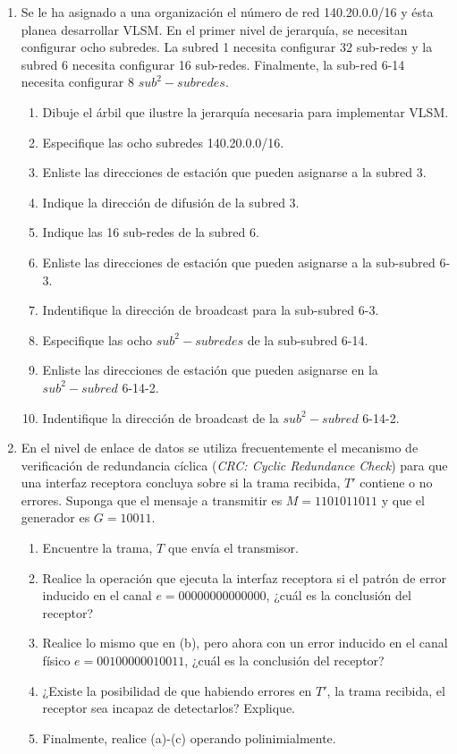 \begin{enumerate}
    \item Se le ha asignado a una organizaci\'on el n\'umero de red 140.20.0.0/16 y \'esta planea desarrollar VLSM. En el primer nivel de jerarqu\'ia,
    se necesitan configurar ocho subredes. La subred 1 necesita configurar 32 sub-redes y la subred 6 necesita configurar 16 sub-redes. Finalmente, la
    sub-red 6-14 necesita configurar 8 \(sub^2-subredes\).
    \begin{enumerate}
        \item Dibuje el \'arbil que ilustre la jerarqu\'ia necesaria para implementar VLSM.
        \item Especifique las ocho subredes 140.20.0.0/16.
        \item Enliste las direcciones de estaci\'on que pueden asignarse a la subred 3.
        \item Indique la direcci\'on de difusi\'on de la subred 3.
        \item Indique las 16 sub-redes de la subred 6.
        \item Enliste las direcciones de estaci\'on que pueden asignarse a la sub-subred 6-3.
        \item Indentifique la direcci\'on de broadcast para la sub-subred 6-3.
        \item Especifique las ocho \(sub^2-subredes\) de la sub-subred 6-14.
        \item Enliste las direcciones de estaci\'on que pueden asignarse en la \(sub^2-subred\) 6-14-2.
        \item Indentifique la direcci\'on de broadcast de la \(sub^2-subred\) 6-14-2.
    \end{enumerate}

    \item En el nivel de enlace de datos se utiliza frecuentemente el mecanismo de verificaci\'on de redundancia c\'iclica (\textit{CRC: Cyclic 
    Redundance Check}) para que una interfaz receptora concluya sobre si la trama recibida, \(T'\) contiene o no errores. Suponga que el mensaje
    a transmitir es \(M=1101011011\) y que el generador es \(G=10011\).
    \begin{enumerate}
        \item Encuentre la trama, \(T\) que env\'ia el transmisor.
        \item Realice la operaci\'on que ejecuta la interfaz receptora si el patr\'on de error inducido en el canal \(e=00000000000000\), ¿cu\'al 
        es la conclusi\'on del receptor?
        \item Realice lo mismo que en (b), pero ahora con un error inducido en el canal f\'isico \(e=00100000010011\), ¿cu\'al es la conclusi\'on
        del receptor?
        \item ¿Existe la posibilidad de que habiendo errores en \(T'\), la trama recibida, el receptor sea incapaz de detectarlos? Explique.
        \item Finalmente, realice (a)-(c) operando polinimialmente.
    \end{enumerate}
\end{enumerate}